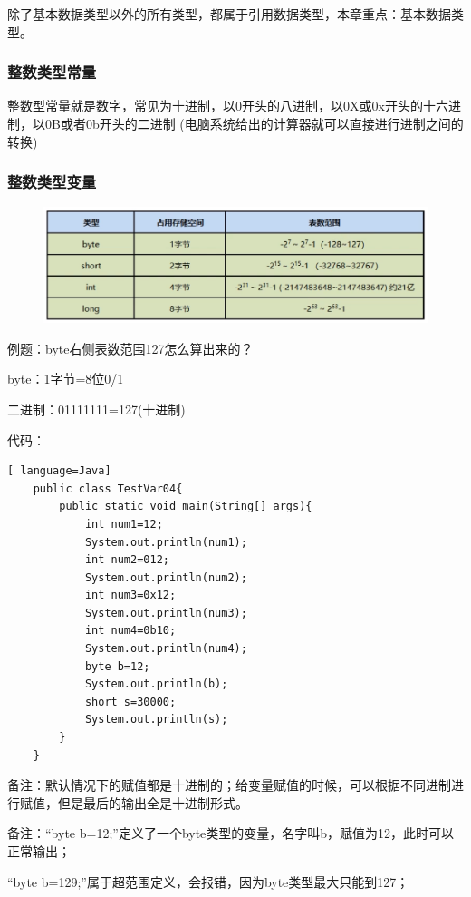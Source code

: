 \documentclass{article}
\begin{document}
	除了基本数据类型以外的所有类型，都属于引用数据类型，本章重点：基本数据类型。
	
	\subsubsection{整数类型常量}
	
	整数型常量就是数字，常见为十进制，以0开头的八进制，以0X或0x开头的十六进制，以0B或者0b开头的二进制
	(电脑系统给出的计算器就可以直接进行进制之间的转换)
	
	\subsubsection{整数类型变量}
	
	\begin{figure}[ht]
		\centering
		\includegraphics[width=120mm]{07.png}
	\end{figure}
	
	例题：byte右侧表数范围127怎么算出来的？
	
	byte：1字节=8位0/1
	
	二进制：01111111=127(十进制)
	
\bigskip	
	
	代码：
	\begin{lstlisting}[ language=Java]
	public class TestVar04{
		public static void main(String[] args){
			int num1=12;
			System.out.println(num1);
			int num2=012;
			System.out.println(num2);
			int num3=0x12;
			System.out.println(num3);
			int num4=0b10;
			System.out.println(num4);
			byte b=12;
			System.out.println(b);
			short s=30000;
			System.out.println(s);
		}
	}
	\end{lstlisting}
	
	备注：默认情况下的赋值都是十进制的；给变量赋值的时候，可以根据不同进制进行赋值，但是最后的输出全是十进制形式。
	
	备注：“byte b=12;”定义了一个byte类型的变量，名字叫b，赋值为12，此时可以正常输出；
	
	\setlength{\parindent}{5em}“byte b=129;”属于超范围定义，会报错，因为byte类型最大只能到127；
	
\end{document}
